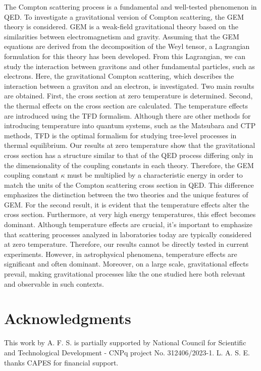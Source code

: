 \documentclass[11pt,showpacs,preprintnumbers,amsmath,amssymb,prd,nofootinbib,superscriptaddress]{revtex4-2}
\begin{document}
The Compton scattering process is a fundamental and well-tested phenomenon in QED. To investigate a gravitational version of Compton scattering, the GEM theory is considered. GEM is a weak-field gravitational theory based on the similarities between electromagnetism and gravity. Assuming that the GEM equations are derived from the decomposition of the Weyl tensor, a Lagrangian formulation for this theory has been developed. From this Lagrangian, we can study the interaction between gravitons and other fundamental particles, such as electrons. Here, the gravitational Compton scattering, which describes the interaction between a graviton and an electron, is investigated. Two main results are obtained. First, the cross section at zero temperature is determined. Second, the thermal effects on the cross section are calculated. The temperature effects are introduced using the TFD formalism. Although there are other methods for introducing temperature into quantum systems, such as the Matsubara and CTP methods, TFD is the optimal formalism for studying tree-level processes in thermal equilibrium. Our results at zero temperature show that the gravitational cross section has a structure similar to that of the QED process differing only in the dimensionality of the coupling constants in each theory. Therefore, the GEM coupling constant $\kappa$ must be multiplied by a characteristic energy in order to match the units of the Compton scattering cross section in QED. This difference emphasizes the distinction between the two theories and the unique features of GEM. For the second result, it is evident that the temperature effects alter the cross section. Furthermore, at very high energy temperatures, this effect becomes dominant. Although temperature effects are crucial, it's important to emphasize that scattering processes analyzed in laboratories today are typically considered at zero temperature. Therefore, our results cannot be directly tested in current experiments. However, in astrophysical phenomena, temperature effects are significant and often dominant. Moreover, on a large scale, gravitational effects prevail, making gravitational processes like the one studied here both relevant and observable in such contexts.


\section*{Acknowledgments}

This work by A. F. S. is partially supported by National Council for Scientific and Technological Develo\-pment - CNPq project No. 312406/2023-1. L. A. S. E. thanks CAPES for financial support. 
\end{document}

